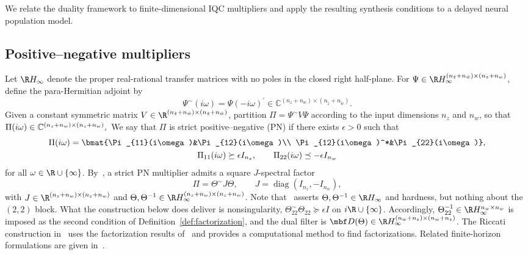 We relate the duality framework to finite-dimensional IQC multipliers and
apply the resulting synthesis conditions to a delayed neural population
model.

\subsection{Positive--negative multipliers}

Let $\R H_\infty$ denote the proper real-rational transfer matrices with
no poles in the closed right half-plane. For
$\Psi\in\R H_\infty^{(n_{\tilde z}+n_{\tilde w})\times(n_z+n_w)}$,
define the para-Hermitian adjoint by
\begin{equation*}
 \Psi^\sim(i\omega)=\Psi(-i\omega)^\prime
 \in\mathbb C^{(n_z+n_w)\times(n_{\tilde z}+n_{\tilde w})}.
\end{equation*}
Given a constant symmetric matrix
$V\in\R^{(n_{\tilde z}+n_{\tilde w})\times(n_{\tilde z}+n_{\tilde w})}$,
partition $\Pi=\Psi^\sim V\Psi$ according to the input dimensions
$n_z$ and $n_w$, so that \(
 \Pi(i\omega)\in\mathbb C^{(n_z+n_w)\times(n_z+n_w)},\\
\)
We say that $\Pi$ is strict positive--negative (PN)
if there exists $\epsilon>0$ such that
\begin{equation*}
 \begin{gathered}
 \Pi(i\omega)=
 \bmat{\Pi_{11}(i\omega)&\Pi_{12}(i\omega)\\
       \Pi_{12}(i\omega)^*&\Pi_{22}(i\omega)},\\
 \Pi_{11}(i\omega)\succeq\epsilon I_{n_z},\qquad
 \Pi_{22}(i\omega)\preceq-\epsilon I_{n_w}
 \end{gathered}
\end{equation*}
for all $\omega\in\R\cup\{\infty\}$. By~\cite[Thm.~4]{6915700}, a
strict PN multiplier admits a square $J$-spectral factor
\begin{equation*}
\Pi=\Theta^\sim J\Theta,
 \qquad J=\operatorname{diag}(I_{n_z},-I_{n_w}),
\end{equation*}
with $J\in\R^{(n_z+n_w)\times(n_z+n_w)}$ and
$\Theta,\Theta^{-1}\in\R H_\infty^{(n_z+n_w)\times(n_z+n_w)}$.
Note that~\cite[Thm.~4]{6915700} asserts $\Theta,\Theta^{-1}\in\R H_\infty$
and hardness, but nothing about the $(2,2)$ block. What the construction
below does deliver is nonsingularity,
$\Theta_{22}^\sim\Theta_{22}\succeq\epsilon I$ on $i\R\cup\{\infty\}$.
Accordingly, $\Theta_{22}^{-1}\in\R H_\infty^{n_w\times n_w}$ is imposed
as the second condition of Definition~\ref{def:factorization}, and the dual filter is
$\mbf D(\Theta)\in\R H_\infty^{(n_w+n_z)\times(n_w+n_z)}$. The Riccati construction 
in~\cite[App.~B]{Pfifer2015} uses the factorization results of~\cite{MEINSMA1995243}
and provides a computational method to find factorizations. Related
finite-horizon formulations are given in~\cite{carrasco2018equivalence,scherer2018dynamicdissipation}.

